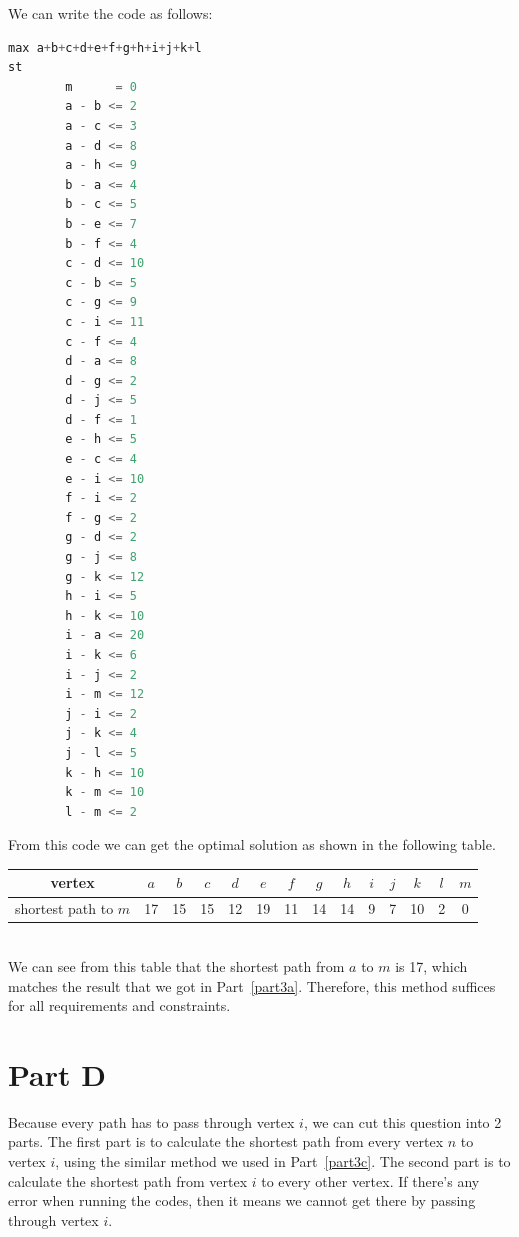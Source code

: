 \documentclass[11pt]{scrreprt}
\begin{document}
We can write the code as follows:
\begin{lstlisting}[language=c]
max a+b+c+d+e+f+g+h+i+j+k+l
st
        m      = 0 
        a - b <= 2
        a - c <= 3
        a - d <= 8
        a - h <= 9
        b - a <= 4
        b - c <= 5
        b - e <= 7
        b - f <= 4
        c - d <= 10
        c - b <= 5
        c - g <= 9
        c - i <= 11
        c - f <= 4
        d - a <= 8
        d - g <= 2
        d - j <= 5
        d - f <= 1
        e - h <= 5
        e - c <= 4
        e - i <= 10
        f - i <= 2
        f - g <= 2
        g - d <= 2
        g - j <= 8
        g - k <= 12
        h - i <= 5
        h - k <= 10
        i - a <= 20
        i - k <= 6
        i - j <= 2
        i - m <= 12
        j - i <= 2
        j - k <= 4
        j - l <= 5
        k - h <= 10
        k - m <= 10
        l - m <= 2
\end{lstlisting}

From this code we can get the optimal solution as shown in the following table.\\
\begin{tabular}{|c|c|c|c|c|c|c|c|c|c|c|c|c|c|}
	\hline vertex & $a$   &  $b$ & $c$ & $d$ & $e$ & $f$ & $g$ & $h$ & $i$  & $j$ & $k$ & $l$ & $m$   \\
	\hline shortest path to $m$ & 17 & 15 & 15 & 12 & 19 & 11 & 14 & 14 & 9 & 7 & 10 & 2 & 0 \\
	\hline
\end{tabular} \\

We can see from this table that the shortest path from $a$ to $m$ is 17, which matches the result that we got in Part~\ref{part3a}. Therefore, this method suffices for all requirements and constraints.

\section{Part D}

Because every path has to pass through vertex $i$, we can cut this question into 2 parts. The first part is to calculate the shortest path from every vertex $n$ to vertex $i$, using the similar method we used in Part~\ref{part3c}. The second part is to calculate the shortest path from vertex $i$ to every other vertex. If there's any error when running the codes, then it means we cannot get there by passing through vertex $i$. 
\end{document}
